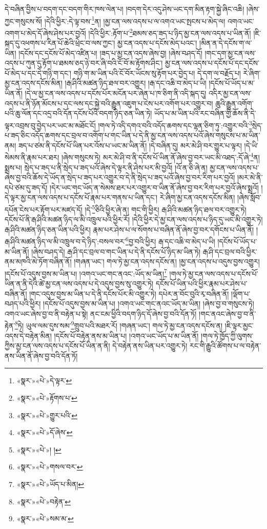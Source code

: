 དེ་བཞིན་བྱིས་པ་བདག་དང་བདག་གིར་ཁས་ལེན་པ། །བདག་དེར་འདུ་ཤེས་ཡང་དག་མིན་རྟག་སྐྱེ་ཞིང་འཆི། །ཞེས་ཀྱང་གསུངས་སོ། །དེའི་ཕྱིར་:དེ་ལྟ་བས་\footnote{«སྣར་»«པེ་»དེ་ལྟར་}ན། །མྱ་ངན་ལས་འདས་པ་ལ་འགའ་ཡང་སྤངས་པ་མེད་ལ། འགའ་ཡང་འགག་པ་མེད་དོ་ཞེས་ཤེས་པར་བྱའོ། །དེའི་ཕྱིར་:རྟོག་པ་\footnote{«སྣར་»«པེ་»རྟོགས་པ་}ཐམས་ཅད་ཟད་པ་ཉིད་མྱ་ངན་ལས་འདས་པ་ཡིན་ནོ། །ཇི་སྐད་དུ་འཕགས་པ་རིན་པོ་ཆེའི་ཕྲེང་བ་ལས་ཀྱང་། མྱ་ངན་འདས་པ་དངོས་མེད་པའང་། །མིན་ན་དེ་དངོས་ག་ལ་ཡིན། །དངོས་དང་དངོས་པོ་མེད་འཛིན་པ། །ཟད་པ་མྱ་ངན་འདས་ཞེས་བྱ། །ཞེས་བཤད་དོ། །གང་དག་མྱ་ངན་ལས་འདས་པ་ཀུན་དུ་རྟོག་པ་ཐམས་ཅད་ཉེ་བར་ཞི་བའི་ངོ་བོ་མ་རྟོགས་ཤིང་། མྱ་ངན་ལས་འདས་པ་དངོས་པོ་དང་དངོས་པོ་མེད་པ་དང་དེ་གཉི་ག་དང་། གཉི་ག་མ་ཡིན་པའི་ངོ་བོར་ཡོངས་སུ་རྟོག་པར་བྱེད་པ། དེ་དག་ལ་བརྗོད་པ། རེ་ཞིག་མྱ་ངན་འདས་དངོས་མིན། །རྒ་ཤིའི་མཚན་ཉིད་ཐལ་བར་འགྱུར། །རྒ་དང་འཆི་བ་མེད་པ་ཡི། །དངོས་པོ་ཡོད་པ་མ་ཡིན་ནོ། །དེ་ལ་མྱ་ངན་ལས་འདས་པ་དངོས་པོར་མངོན་པར་ཞེན་པ་ཁ་ཅིག་ནི་འདི་སྐད་དུ། འདིར་མྱ་ངན་ལས་འདས་པ་ནི་ཉོན་མོངས་པ་དང་ལས་དང་སྐྱེ་བའི་རྒྱུན་འཇུག་པ་ངེས་པར་འགོག་པར་འགྱུར་བ། ཆུའི་རྒྱུན་འགོག་པའི་ཆུ་ལོན་དང་འདྲ་བའི་དོན་དངོས་པོའི་བདག་ཉིད་ཅན་ཡིན་ཏེ། ཡོད་པ་མ་ཡིན་པའི་རང་བཞིན་གྱི་ཆོས་ནི་དེ་ལྟར་འབྲས་བུ་བྱེད་པར་ཡང་མ་མཐོང་ངོ། །གལ་ཏེ་འདི་དགའ་བའི་འདོད་ཆགས་དང་ལྷན་ཅིག་ཏུ་:འགྱུར་བའི་\footnote{«སྣར་»«པེ་»གྱུར་པའི་}སྲེད་པ་ཟད་ཅིང་འདོད་ཆགས་དང་བྲལ་བ་འགོག་པ་གང་ཡིན་པ་དེ་ནི་མྱ་ངན་ལས་འདས་པའོ་ཞེས་གསུངས་པ་མ་ཡིན་ནམ། ཟད་པ་ཙམ་ནི་དངོས་པོ་ཡིན་པར་འོས་པ་ཡང་མ་ཡིན་ནོ། །དེ་བཞིན་དུ། མར་མེ་ཤི་བར་གྱུར་པ་ལྟར། །དེ་ཡི་སེམས་ནི་རྣམ་པར་ཐར། །ཞེས་གསུངས་ཏེ། མར་མེ་ཤི་བ་ནི་དངོས་པོ་ཡིན་ནོ་ཞེས་བྱ་བར་ཡང་མི་འཐད་:དོ་ཞེ་\footnote{«སྣར་»«པེ་»དོ་ཞེས་}ན། སྨྲས་པ། སྲེད་པ་ཟད་པ་ནི་སྲེད་པ་ཟད་པའོ་ཞེས་དེ་ལྟར་ནི་ཤེས་པར་མི་བྱའོ། །འོ་ན་ཅི་ཞེ་ན། མྱ་ངན་ལས་འདས་པ་ཞེས་བྱ་བའི་ཆོས་དེ་ཡོད་ན་སྲེད་པ་ཟད་པར་འགྱུར་བ་དེ་ནི་སྲེད་པ་ཟད་པའོ་ཞེས་བྱ་བར་རིག་པར་བྱའོ། །མར་མེ་ནི་དཔེ་ཙམ་དུ་ཟད་དོ། །དེར་ཡང་གང་ཡོད་ན་སེམས་ཐར་པར་འགྱུར་བ་ཡིན་ནོ་ཞེས་བྱ་བར་རིག་པར་བྱའོ་ཞེས་སྨྲའོ། །དེ་ལྟར་མྱ་ངན་ལས་འདས་པ་དངོས་པོ་རྣམ་པར་གནས་པ་ཡིན་དང་། རེ་ཞིག་མྱ་ངན་འདས་དངོས་མིན། །ཞེས་སློབ་དཔོན་ངེས་པར་རྟོག་པར་མཛད་དོ། །དེ་\footnote{«སྣར་»«པེ་»། །}ཅིའི་ཕྱིར་ཞེ་ན། གང་གི་ཕྱིར། རྒ་ཤིའི་མཚན་ཉིད་ཐལ་བར་འགྱུར་ཏེ། དངོས་པོ་ནི་རྒ་ཤིའི་མཚན་ཉིད་ལ་མི་འཁྲུལ་པའི་ཕྱིར་རོ། །དེའི་ཕྱིར་དེ་མྱ་ངན་ལས་འདས་པ་ཉིད་དུ་ཡང་མི་འགྱུར་ཏེ། རྒ་ཤིའི་མཚན་ཉིད་ཅན་ཡིན་པའི་ཕྱིར། རྣམ་པར་ཤེས་པ་ལ་སོགས་པ་བཞིན་ནོ་ཞེས་བྱ་བར་དགོངས་པ་ཡིན་ནོ། །རྒ་ཤིའི་མཚན་ཉིད་ལ་མི་འཁྲུལ་བ་དེ་ཉིད་:བསལ་བར་\footnote{«སྣར་»«པེ་»གསལ་བར་}བྱ་བའི་ཕྱིར། རྒ་དང་འཆི་བ་མེད་པ་ཡི། །དངོས་པོ་ཡོད་པ་མ་ཡིན་ནོ། །ཞེས་བཤད་དེ། རྒ་ཤི་དང་བྲལ་བ་གང་ཡིན་པ་དེ་ནི་དངོས་པོ་ཉིད་མ་ཡིན་ཏེ། རྒ་ཤི་དང་བྲལ་བའི་ཕྱིར་ནམ་མཁའི་མེ་ཏོག་བཞིན་ནོ། །གཞན་ཡང་། གལ་ཏེ་མྱ་ངན་འདས་དངོས་ན། །མྱ་ངན་འདས་པ་འདུས་བྱས་འགྱུར། །དངོས་པོ་འདུས་བྱས་མ་ཡིན་པ། །འགའ་ཡང་གང་ནའང་:ཡོད་མ་ཡིན།\footnote{«སྣར་»«པེ་»ཡོད་པ་མིན།} །གལ་ཏེ་མྱ་ངན་ལས་འདས་པ་དངོས་པོ་ཡིན་ན་ནི་དེའི་ཚེ་མྱ་ངན་ལས་འདས་པ་དེ་འདུས་བྱས་སུ་འགྱུར་ཏེ། དངོས་པོ་ཡིན་པའི་ཕྱིར་རྣམ་པར་ཤེས་པ་བཞིན་ནོ། །གང་འདུས་བྱས་མ་ཡིན་པ་དེ་ནི་དངོས་པོར་མི་འགྱུར་ཏེ། དཔེར་ན་བོང་བུའི་རྭ་བཞིན་ནོ། །ལྡོག་པ་བཤད་པའི་ཕྱིར། །དངོས་པོ་འདུས་བྱས་མ་ཡིན་པ། །འགའ་ཡང་གང་ནའང་ཡོད་མ་ཡིན། །ཞེས་བྱ་བ་གསུངས་ཏེ། འགའ་ཡང་ཞེས་བྱ་བ་ནི་བརྟེན་པ་སྟེ། ནང་ངམ་ཕྱིའི་བདག་ཉིད་དོ་ཞེས་བྱ་བའི་དོན་ཏོ། །གང་ནའང་ཞེས་བྱ་བ་ནི་རྟེན་\footnote{«སྣར་»«པེ་»བརྟེན་}ཏེ། ཡུལ་ལམ་དུས་སམ་\footnote{«སྣར་»«པེ་»སམ་མ་}གྲུབ་པའི་མཐར་རོ། །གཞན་ཡང་། གལ་ཏེ་མྱ་ངན་འདས་དངོས་ན། །ཇི་ལྟར་མྱང་འདས་དེ་བརྟེན་མིན། །དངོས་པོ་བརྟེན་ནས་མ་ཡིན་པ། །འགའ་ཡང་ཡོད་པ་མ་ཡིན་ནོ། །གལ་ཏེ་ཁྱོད་ཀྱི་ལུགས་ཀྱིས་མྱ་ངན་ལས་འདས་པ་དངོས་པོ་ཡིན་ན་ནི། དེ་བརྟེན་ནས་ཡིན་པར་འགྱུར་ཏེ། རང་གི་རྒྱུའི་ཚོགས་པ་ལ་བརྟེན་ནས་ཡིན་ནོ་ཞེས་བྱ་བའི་དོན་ཏོ། 